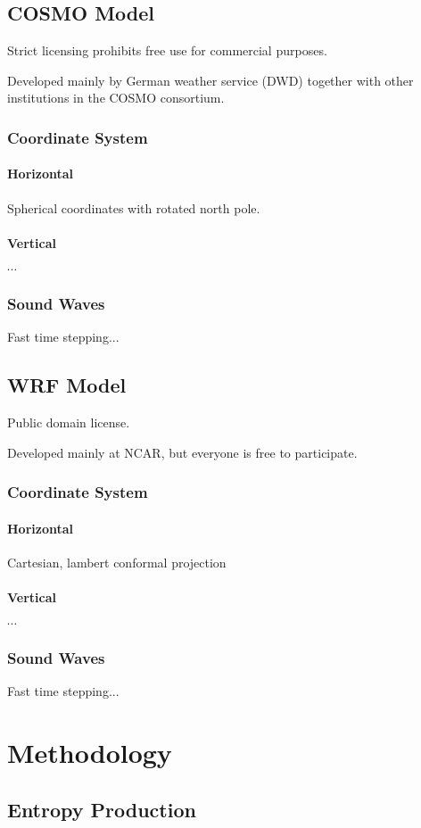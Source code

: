 \section{COSMO Model}
\p
Strict licensing prohibits free use for commercial purposes.

Developed mainly by German weather service (DWD) together with other institutions in the COSMO consortium.

\subsection{Coordinate System}
\subsubsection{Horizontal}
\p
Spherical coordinates with rotated north pole.
\subsubsection{Vertical}
\p
$\cdots$
\subsection{Sound Waves}
\p
Fast time stepping...
\section{WRF Model}
\p
Public domain license.

Developed mainly at NCAR, but everyone is free to participate.
\subsection{Coordinate System}
\subsubsection{Horizontal}
\p
Cartesian, lambert conformal projection
\subsubsection{Vertical}
\p
$\cdots$
\subsection{Sound Waves}
\p
Fast time stepping...
\chapter{Methodology}
\section{Entropy Production}
